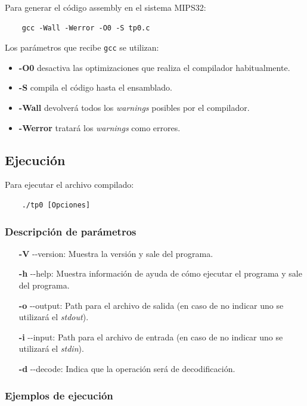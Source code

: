 \documentclass[titlepage,a4paper]{article}
\begin{document}
Para generar el código assembly en el sistema MIPS32:
\begin{verbatim}
    gcc -Wall -Werror -O0 -S tp0.c
\end{verbatim}

Los parámetros que recibe \verb|gcc|  \cite{gcc_parameters} se utilizan:
\begin{itemize}
    \item \textbf{-O0} desactiva las optimizaciones que realiza el compilador habitualmente.
    
    \item \textbf{-S} compila el código hasta el ensamblado.
    \item \textbf{-Wall} devolverá todos los \textit{warnings} posibles por el compilador.
    \item \textbf{-Werror} tratará los \textit{warnings} como errores.
\end{itemize}

\subsection{Ejecución}
Para ejecutar el archivo compilado:
\begin{verbatim}
    ./tp0 [Opciones]
\end{verbatim}

\subsubsection{Descripción de parámetros}
\begin{itemize}
   \item[\textbf{-V}] {-}{-}version: Muestra la versión y sale del programa.
    \item[\textbf{-h}] {-}{-}help: Muestra información de ayuda de cómo ejecutar el programa y sale del programa.
    \item[\textbf{-o}] {-}{-}output: Path para el archivo de salida (en caso de no indicar uno se utilizará el \textit{stdout}).
    \item[\textbf{-i}] {-}{-}input: Path para el archivo de entrada (en caso de no indicar uno se utilizará el \textit{stdin}).
    \item[\textbf{-d}] {-}{-}decode:  Indica que la operación será de decodificación.
\end{itemize}

\subsubsection{Ejemplos de ejecución}
\end{document}
